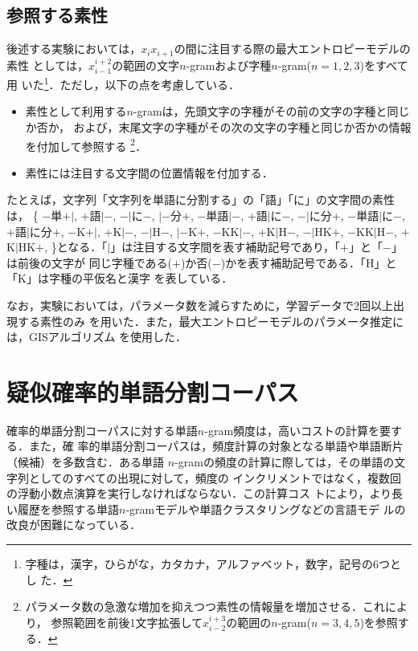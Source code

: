 \documentclass[japanese]{jnlp_1.4}
\begin{document}
\subsection{参照する素性}

後述する実験においては，$x_{i}x_{i+1}$の間に注目する際の最大エントロピーモデルの素性
としては，$x_{i-1}^{i+2}$の範囲の文字$n$-gramおよび字種$n$-gram($n=1,2,3$)をすべて用
いた\footnote{字種は，漢字，ひらがな，カタカナ，アルファベット，数字，記号の6つとし
た．}．ただし，以下の点を考慮している．
\begin{itemize}

\item 素性として利用する$n$-gramは，先頭文字の字種がその前の文字の字種と同じか否か，
  および，末尾文字の字種がその次の文字の字種と同じか否かの情報を付加して参照する
  \footnote{パラメータ数の急激な増加を抑えつつ素性の情報量を増加させる．これにより，
  参照範囲を前後1文字拡張して$x_{i-2}^{i+3}$の範囲の$n$-gram($n=3,4,5$)を参照する．}．

\item 素性には注目する文字間の位置情報を付加する．

\end{itemize}
たとえば，文字列「文字列を単語に分割する」の「語」「に」の文字間の素性は，
\{
$-$単$+|$, $+$語$|-$, $-|$に$-$, $|-$分$+$, 
$-$単語$|-$, $+$語$|$に$-$, $-|$に分$+$, 
$-$単語$|$に$-$, $+$語$|$に分$+$, 
$-$K$+|$, $+$K$|-$, $-|$H$-$, $|-$K$+$, 
$-$KK$|-$, $+$K$|$H$-$, $-|$HK$+$, 
$-$KK$|$H$-$, $+$K$|$HK$+$, 
\}となる．「$|$」は注目する文字間を表す補助記号であり，「$+$」と「$-$」は前後の文字が
同じ字種である($+$)か否($-$)かを表す補助記号である．「H」と「K」は字種の平仮名と漢字
を表している．

なお，実験においては，パラメータ数を減らすために，学習データで2回以上出現する素性のみ
を用いた．また，最大エントロピーモデルのパラメータ推定には，GISアルゴリズム
\cite{Generalized.Iterative.Scaling.For.Log-Linear.Models}を使用した．



\section{疑似確率的単語分割コーパス}

確率的単語分割コーパスに対する単語$n$-gram頻度は，高いコストの計算を要する．また，確
率的単語分割コーパスは，頻度計算の対象となる単語や単語断片（候補）を多数含む．ある単語
$n$-gramの頻度の計算に際しては，その単語の文字列としてのすべての出現に対して，頻度の
インクリメントではなく，複数回の浮動小数点演算を実行しなければならない．この計算コス
トにより，より長い履歴を参照する単語$n$-gramモデルや単語クラスタリングなどの言語モデ
ルの改良が困難になっている．
\end{document}
